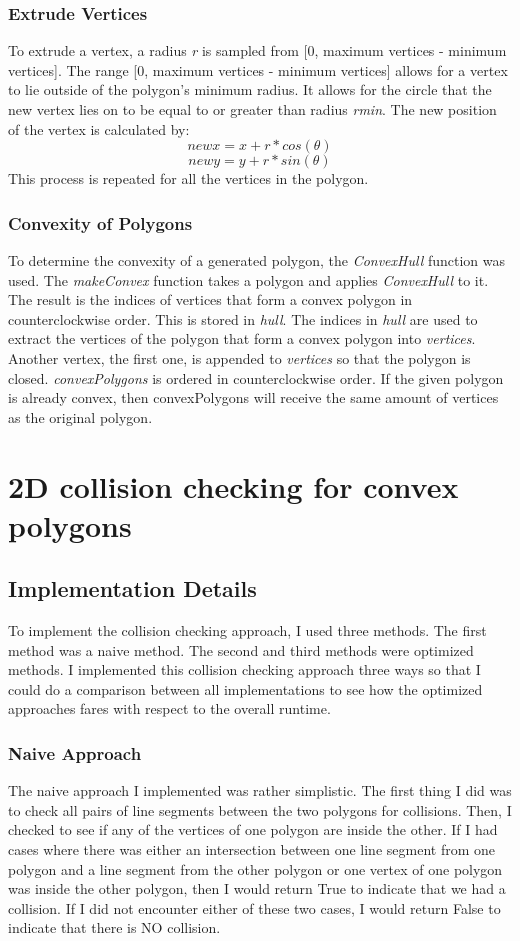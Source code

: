 \documentclass{article}
\begin{document}
\subsubsection{Extrude Vertices}
To extrude a vertex, a radius \textit{r} is sampled from [0, maximum vertices - minimum vertices]. The range [0, maximum vertices - minimum vertices] allows for a vertex to lie outside of the polygon's minimum radius. It allows for the circle that the new vertex lies on to be equal to or greater than radius \textit{rmin}. The new position of the vertex is calculated by: 
    \[new x = x + r*cos(\theta)\]
    \[new y = y + r*sin(\theta)\]
This process is repeated for all the vertices in the polygon. 
\subsubsection{Convexity of Polygons}
To determine the convexity of a generated polygon, the \textit{ConvexHull} function was used. The \textit{makeConvex} function takes a polygon and applies \textit{ConvexHull} to it. The result is the indices of vertices that form a convex polygon in counterclockwise order. This is stored in \textit{hull}. The indices in \textit{hull} are used to extract the vertices of the polygon that form a convex polygon into \textit{vertices}. Another vertex, the first one, is appended to \textit{vertices} so that the polygon is closed. \textit{convexPolygons} is ordered in counterclockwise order. If the given polygon is already convex, then convexPolygons will receive the same amount of vertices as the original polygon. 

\section{2D collision checking for convex polygons}
\subsection{Implementation Details} 
To implement the collision checking approach, I used three methods. The first method was a naive method. The second and third methods were optimized methods. I implemented this collision checking approach three ways so that I could do a comparison between all implementations to see how the optimized approaches fares with respect to the overall runtime. 

\subsubsection{Naive Approach}
The naive approach I implemented was rather simplistic. The first thing I did was to check all pairs of line segments between the two polygons for collisions. Then, I checked to see if any of the vertices of one polygon are inside the other. If I had cases where there was either an intersection between one line segment from one polygon and a line segment from the other polygon or one vertex of one polygon was inside the other polygon, then I would return True to indicate that we had a collision. If I did not encounter either of these two cases, I would return False to indicate that there is NO collision.  
\end{document}
